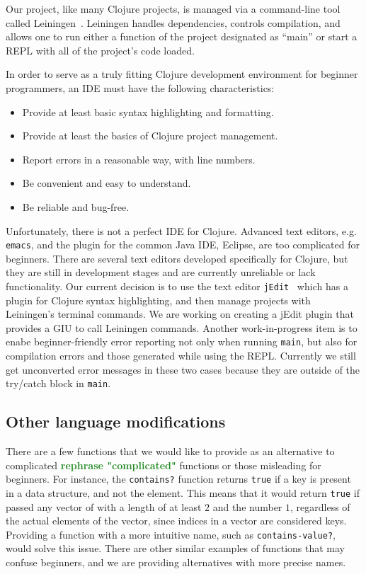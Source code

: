 \documentclass[submission,copyright,creativecommons]{eptcs}
\newcommand{\allcomments}[1]{{#1}}
\newcommand{\elenacomment}[1]{{\bf \textcolor{ForestGreen}{\allcomments{{#1}}}}}
\newcommand{\stephencomment}[1]{{\bf \color{StephensBlue}{\allcomments{{#1}}}}} %
\begin{document}
Our project, like many Clojure projects, is managed via a command-line tool called Leiningen~\cite{lein}. Leiningen handles dependencies, controls compilation, and allows one to run either a function of the project designated as ``main'' or start a REPL with all of the project's code loaded. 

In order to serve as a truly fitting Clojure development environment for beginner programmers, %
an IDE must have the following characteristics: 
\begin{itemize}
\item Provide at least basic syntax highlighting and formatting. 
\item Provide at least the basics of Clojure project management. 
\item Report errors in a reasonable way, with line numbers. 
\item Be convenient and easy to understand. 
\item Be reliable and bug-free.
\end{itemize}
Unfortunately, there is not a perfect IDE for Clojure. 
Advanced text editors, e.g. {\tt emacs}, and the plugin for the common Java IDE, Eclipse, are too complicated for beginners. There are several text editors developed specifically for Clojure, but they are still in development stages and are currently unreliable or lack functionality. Our current decision is to use the text editor {\tt jEdit}~\cite{jedit} which has a plugin for Clojure syntax highlighting, and then manage projects with Leiningen's terminal commands.  We are working on creating a jEdit plugin that provides a GIU to call Leiningen commands. Another work-in-progress item is to enabe beginner-friendly error reporting not only when running {\tt main}, but also for compilation errors and those generated while using the REPL. Currently we still get unconverted error messages in these two cases because they are outside of the try/catch block in {\tt main}. 

\subsection{Other language modifications}\label{subsec:other}
There are a few functions that we would like to provide as an alternative to complicated \elenacomment{rephrase "complicated"} functions or those misleading for beginners. For instance, the {\tt contains?} function returns {\tt true} if a key is present in a data structure, and not the element. This means that it would return {\tt true} if passed any vector of with a length of at least $2$ and the number $1$, regardless of the actual elements of the vector, since indices in a vector are considered keys. Providing a function with a more intuitive name, such as {\tt contains-value?}, would solve this issue. There are other similar examples of functions that may confuse beginners, and we are providing alternatives with more precise names.
\end{document}
